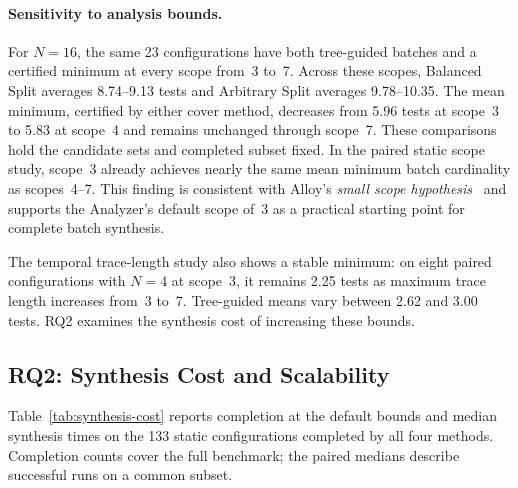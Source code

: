 \documentclass[runningheads]{llncs}
\newcommand{\methodname}[1]{\textup{\textsf{#1}}}
\newcommand{\arbitrarysplit}{\methodname{Arbitrary Split}}
\newcommand{\balancedsplit}{\methodname{Balanced Split}}
\begin{document}
\paragraph{Sensitivity to analysis bounds.}
For $N=16$, the same 23 configurations have both tree-guided batches and a
certified minimum at every scope from~3 to~7. Across these scopes,
\balancedsplit{} averages 8.74--9.13 tests and \arbitrarysplit{} averages
9.78--10.35. The mean minimum, certified by either cover method,
decreases from 5.96 tests at scope~3 to 5.83 at
scope~4 and remains unchanged through scope~7. These comparisons hold the
candidate sets and completed subset fixed.
In the paired static scope study, scope~3 already achieves nearly the same
mean minimum batch cardinality as scopes~4--7. This finding is consistent
with Alloy's \emph{small scope hypothesis}~\cite{jackson2012software} and
supports the Analyzer's default scope of~3 as a practical starting point for
complete batch synthesis.

The temporal trace-length study also shows a stable minimum: on eight paired
configurations with $N=4$ at scope~3, it remains 2.25 tests as maximum trace
length increases from~3 to~7. Tree-guided means vary between 2.62 and 3.00
tests. RQ2 examines the synthesis cost of increasing these bounds.

\subsection{RQ2: Synthesis Cost and Scalability}
\label{sec:rq2}

Table~\ref{tab:synthesis-cost} reports completion at the default bounds and
median synthesis times on the 133 static configurations completed by all four
methods. Completion counts cover the full benchmark; the paired medians
describe successful runs on a common subset.
\end{document}
